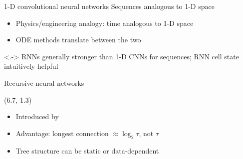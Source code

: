 \begin{frame}{1-D convolutional neural networks}
    Sequences analogous to 1-D space
    \begin{itemize}
        \item<+-> Physics/engineering analogy: time analogous to 1-D space
        \item ODE methods translate between the two
    \end{itemize}

    \vspace{-3.5mm}
    \begin{center}
        
        \vspace{3.5mm}

    \end{center}

    \uncover<.->{
        RNNs generally stronger than 1-D CNNs for sequences;
        RNN cell state intuitively helpful
    }
\end{frame}

\begin{frame}{Recursive neural networks}
    

    \begin{textblock}{5.1}(6.7, 1.3)
        \begin{itemize}
            \item Introduced by \citet{PollackAI90}
            \item Advantage: longest connection $\approx \log_2 \tau$, not $\tau$
            \item Tree structure can be static or data-dependent
        \end{itemize}
    \end{textblock}
\end{frame}

